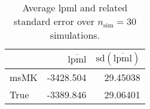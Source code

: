 \begin{table}[H]

\caption{Average lpml and related standard error over $n_{\text{sim}} = 30$ simulations.}
\centering
\begin{tabular}[t]{lrr}
\toprule
  & $\overbar{\text{lpml}}$ & $\text{sd}(\overbar{\text{lpml}})$\\
\midrule
msMK & -3428.504 & 29.45038\\
True & -3389.846 & 29.06401\\
\bottomrule
\end{tabular}
\end{table}